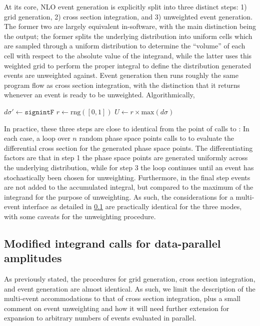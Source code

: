 \documentclass[a4paper,11pt]{article}
\begin{document}
At its core, \mg{} NLO event generation is explicitly split into three distinct steps: 1) grid generation, 2) cross section integration, and 3) unweighted event generation. The former two are largely equivalent in-software, with the main distinction being the output; the former splits the underlying distribution into uniform cells which are sampled through a uniform distribution to determine the ``volume'' of each cell with respect to the absolute value of the integrand, while the latter uses this weighted grid to perform the proper integral to define the distribution generated events are unweighted against. Event generation then runs roughly the same program flow as cross section integration, with the distinction that it returns whenever an event is ready to be unweighted. Algorithmically, 
\begin{algorithmic}
\Repeat
\State $d\sigma' \gets \texttt{signintF}$
\State $r \gets \text{rng}([0,1])$
\State $U \gets r\times \text{max}(d\sigma)$
\end{algorithmic}

In practice, these three steps are close to identical from the point of calls to \sigintf: In each case, a loop over $n$ random phase space points calls to \sigintf to evaluate the differential cross section for the generated phase space points. The differentiating factors are that in step 1 the phase space points are generated uniformly across the underlying distribution, while for step 3 the loop continues until an event has stochastically been chosen for unweighting. Furthermore, in the final step events are not added to the accumulated integral, but compared to the maximum of the integrand for the purpose of unweighting. As such, the considerations for a multi-event interface as detailed in \cref{sec:evgen_vec} are practically identical for the three modes, with some caveats for the unweighting procedure.


\subsection{Modified integrand calls for data-parallel amplitudes}
\label{sec:evgen_vec}


As previously stated, the procedures for grid generation, cross section integration, and event generation are almost identical. As such, we limit the description of the multi-event accommodations to that of cross section integration, plus a small comment on event unweighting and how it will need further extension for expansion to arbitrary numbers of events evaluated in parallel.
\end{document}
